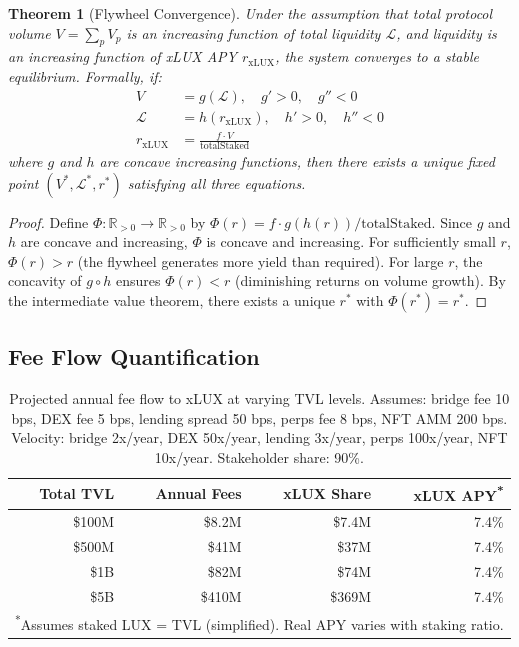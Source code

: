 \documentclass[11pt,twocolumn]{article}
\newtheorem{theorem}{Theorem}[section]
\begin{document}
\begin{theorem}[Flywheel Convergence]\label{thm:flywheel}
Under the assumption that total protocol volume $V = \sum_p V_p$ is an increasing function of total liquidity $\mathcal{L}$, and liquidity is an increasing function of xLUX APY $r_{\text{xLUX}}$, the system converges to a stable equilibrium. Formally, if:
\begin{align}
  V &= g(\mathcal{L}), \quad g' > 0, \quad g'' < 0 \label{eq:fly1} \\
  \mathcal{L} &= h(r_{\text{xLUX}}), \quad h' > 0, \quad h'' < 0 \label{eq:fly2} \\
  r_{\text{xLUX}} &= \frac{f \cdot V}{\text{totalStaked}} \label{eq:fly3}
\end{align}
where $g$ and $h$ are concave increasing functions, then there exists a unique fixed point $(V^*, \mathcal{L}^*, r^*)$ satisfying all three equations.
\end{theorem}

\begin{proof}
Define $\Phi: \mathbb{R}_{>0} \to \mathbb{R}_{>0}$ by $\Phi(r) = f \cdot g(h(r)) / \text{totalStaked}$. Since $g$ and $h$ are concave and increasing, $\Phi$ is concave and increasing. For sufficiently small $r$, $\Phi(r) > r$ (the flywheel generates more yield than required). For large $r$, the concavity of $g \circ h$ ensures $\Phi(r) < r$ (diminishing returns on volume growth). By the intermediate value theorem, there exists a unique $r^*$ with $\Phi(r^*) = r^*$.
\end{proof}

\subsection{Fee Flow Quantification}

\begin{table}[ht]
\centering
\small
\caption{Projected annual fee flow to xLUX at varying TVL levels. Assumes: bridge fee 10 bps, DEX fee 5 bps, lending spread 50 bps, perps fee 8 bps, NFT AMM 200 bps. Velocity: bridge 2x/year, DEX 50x/year, lending 3x/year, perps 100x/year, NFT 10x/year. Stakeholder share: 90\%.}
\label{tab:fee_flow}
\begin{tabular}{@{}rrrr@{}}
\toprule
\textbf{Total TVL} & \textbf{Annual Fees} & \textbf{xLUX Share} & \textbf{xLUX APY\textsuperscript{*}} \\
\midrule
\$100M & \$8.2M & \$7.4M & 7.4\% \\
\$500M & \$41M & \$37M & 7.4\% \\
\$1B & \$82M & \$74M & 7.4\% \\
\$5B & \$410M & \$369M & 7.4\% \\
\bottomrule
\multicolumn{4}{l}{\textsuperscript{*}\scriptsize Assumes staked LUX = TVL (simplified). Real APY varies with staking ratio.}
\end{tabular}
\end{table}
\end{document}
